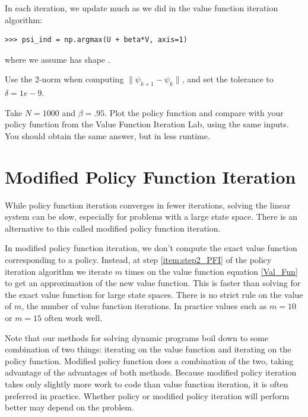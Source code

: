 \begin{problem}
In each iteration, we update  much as we did in the value function iteration algorithm:
\begin{lstlisting}
>>> psi_ind = np.argmax(U + beta*V, axis=1)
\end{lstlisting}
where we assume  has shape .

Use the 2-norm when computing $\|\psi_{k+1} - \psi_k\|$, and set the tolerance to $\delta = 1e-9$.

Take $N = 1000$ and $\beta = .95$.
Plot the policy function and compare with your policy function from the Value Function Iteration Lab, using
the same inputs. You should obtain the same answer, but in less runtime.
\end{problem}

\section*{Modified Policy Function Iteration}
While policy function iteration converges in fewer iterations, solving the linear system can be slow,
especially for problems with a large state space.  There is an alternative to this called modified policy
function iteration.

In modified policy function iteration, we don't compute the exact value function corresponding to a policy.
Instead, at step \ref{item:step2_PFI} of the policy iteration algorithm we iterate $m$ times on the value function
equation \eqref{Val_Fun} to get an approximation of the new value function.  This is faster than solving for the
exact value function for large state spaces.  There is no strict rule on the value of $m$, the number of value function
iterations.  In practice values such as $m=10$ or $m=15$ often work well.

Note that our methods for solving dynamic programs boil down to some combination of two things: iterating on the value
function and iterating on the policy function.  Modified policy function does a combination of the two, taking advantage
of the advantages of both methods.  Because modified policy iteration takes only slightly more work to code than value
function iteration, it is often preferred in practice.  Whether policy or modified policy iteration will perform better
may depend on the problem.


